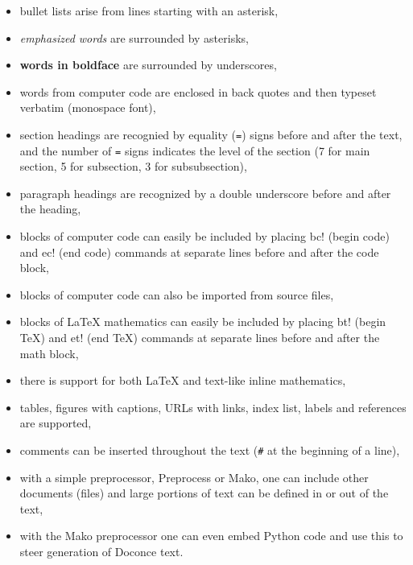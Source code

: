 \documentclass{article}
\begin{document}
\begin{itemize}
  \item bullet lists arise from lines starting with an asterisk,

  \item \emph{emphasized words} are surrounded by asterisks, 

  \item \textbf{words in boldface} are surrounded by underscores, 

  \item words from computer code are enclosed in back quotes and 
    then typeset verbatim (monospace font),

  \item section headings are recognied by equality ({\fontsize{10pt}{10pt}\verb!=!}) signs before 
    and after the text, and the number of {\fontsize{10pt}{10pt}\verb!=!} signs indicates the 
    level of the section (7 for main section, 5 for subsection,
    3 for subsubsection),

  \item paragraph headings are recognized by a double underscore
    before and after the heading,

  \item blocks of computer code can easily be included by placing 
    {\fontsize{10pt}{10pt}\verb!!bc!} (begin code) and {\fontsize{10pt}{10pt}\verb!!ec!} (end code) commands at separate lines
    before and after the code block,

  \item blocks of computer code can also be imported from source files,

  \item blocks of {\LaTeX} mathematics can easily be included by placing
    {\fontsize{10pt}{10pt}\verb!!bt!} (begin TeX) and {\fontsize{10pt}{10pt}\verb!!et!} (end TeX) commands at separate lines
    before and after the math block,

  \item there is support for both {\LaTeX} and text-like inline mathematics,

  \item tables, figures with captions, URLs with links, index list, 
    labels and references are supported,

  \item comments can be inserted throughout the text ({\fontsize{10pt}{10pt}\verb!#!} at the beginning
    of a line),

  \item with a simple preprocessor, Preprocess or Mako, one can include
    other documents (files) and large portions of text can be defined
    in or out of the text,

  \item with the Mako preprocessor one can even embed Python
    code and use this to steer generation of Doconce text.
\end{itemize}
\end{document}

